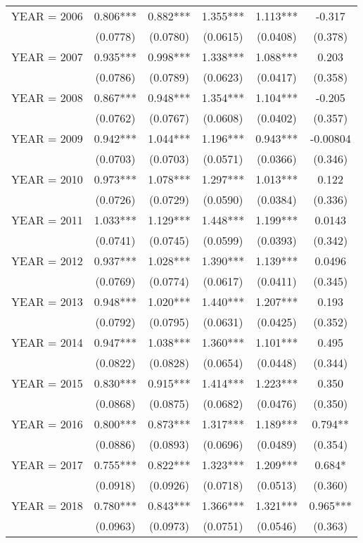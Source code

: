 \begin{tabular}{lccccc}
YEAR = 2006 & 0.806*** & 0.882*** & 1.355*** & 1.113*** & -0.317 \\
 & (0.0778) & (0.0780) & (0.0615) & (0.0408) & (0.378) \\
YEAR = 2007 & 0.935*** & 0.998*** & 1.338*** & 1.088*** & 0.203 \\
 & (0.0786) & (0.0789) & (0.0623) & (0.0417) & (0.358) \\
YEAR = 2008 & 0.867*** & 0.948*** & 1.354*** & 1.104*** & -0.205 \\
 & (0.0762) & (0.0767) & (0.0608) & (0.0402) & (0.357) \\
YEAR = 2009 & 0.942*** & 1.044*** & 1.196*** & 0.943*** & -0.00804 \\
 & (0.0703) & (0.0703) & (0.0571) & (0.0366) & (0.346) \\
YEAR = 2010 & 0.973*** & 1.078*** & 1.297*** & 1.013*** & 0.122 \\
 & (0.0726) & (0.0729) & (0.0590) & (0.0384) & (0.336) \\
YEAR = 2011 & 1.033*** & 1.129*** & 1.448*** & 1.199*** & 0.0143 \\
 & (0.0741) & (0.0745) & (0.0599) & (0.0393) & (0.342) \\
YEAR = 2012 & 0.937*** & 1.028*** & 1.390*** & 1.139*** & 0.0496 \\
 & (0.0769) & (0.0774) & (0.0617) & (0.0411) & (0.345) \\
YEAR = 2013 & 0.948*** & 1.020*** & 1.440*** & 1.207*** & 0.193 \\
 & (0.0792) & (0.0795) & (0.0631) & (0.0425) & (0.352) \\
YEAR = 2014 & 0.947*** & 1.038*** & 1.360*** & 1.101*** & 0.495 \\
 & (0.0822) & (0.0828) & (0.0654) & (0.0448) & (0.344) \\
YEAR = 2015 & 0.830*** & 0.915*** & 1.414*** & 1.223*** & 0.350 \\
 & (0.0868) & (0.0875) & (0.0682) & (0.0476) & (0.350) \\
YEAR = 2016 & 0.800*** & 0.873*** & 1.317*** & 1.189*** & 0.794** \\
 & (0.0886) & (0.0893) & (0.0696) & (0.0489) & (0.354) \\
YEAR = 2017 & 0.755*** & 0.822*** & 1.323*** & 1.209*** & 0.684* \\
 & (0.0918) & (0.0926) & (0.0718) & (0.0513) & (0.360) \\
YEAR = 2018 & 0.780*** & 0.843*** & 1.366*** & 1.321*** & 0.965*** \\
 & (0.0963) & (0.0973) & (0.0751) & (0.0546) & (0.363) \\

\end{tabular}
